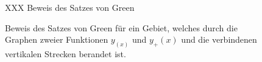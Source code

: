 %
%
%
\begin{figure}
\centering
\vspace*{2cm}
XXX Beweis des Satzes von Green
\vspace*{2cm}
\caption{Beweis des Satzes von Green für ein Gebiet, welches durch
die Graphen zweier Funktionen $y_(x)$ und $y_+(x)$ und die verbindenen
vertikalen Strecken berandet ist.
\label{buch:felder:fundamentallemma:fig:greenbeweis}}
\end{figure}
